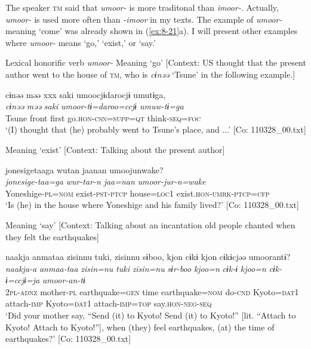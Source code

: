The speaker \textsc{tm} said that \textit{umoor-} is more traditonal than \textit{imoor-}. Actually, \textit{umoor-} is used more often than \textit{-imoor} in my texts. The example of \textit{umoor-} meaning ‘come’ was already shown in (\ref{ex:8-21}a). I will present other examples where \textit{umoor-} means ‘go,’ ‘exist,’ or ‘say.’

\ea\label{ex:8-22}
  Lexical honorific verb \textit{umoor-}
\ea Meaning ‘go’ [Context: US thought that the present author went to the house of \textsc{tm}, who is \textit{cɨnəə} ‘Tsune’ in the following example.]

   {\US}
\glll   cɨnəə  məə  xxx  saki  umoocjɨdarocjɨ  umutɨga,\\
\textit{cɨnəə}  \textit{məə}    \textit{saki}  \textit{umoor-tɨ=daroo=ccjɨ  umuw-tɨ=ga}\\
Tsune  front    first  go.\textsc{hon}-\textsc{csn}=\textsc{supp}=\textsc{qt}  think-\textsc{seq}=\textsc{foc}\\
\glt ‘(I) thought that (he) probably went to Tsune’s place, and ...’ [Co: 110328\_00.txt]

\ex Meaning ‘exist’ [Context: Talking about the present author]

   {\US}
\glll   jonesigetaaga  wutan  jaanan      umoojunwake?\\
\textit{jonesige-taa=ga}  \textit{wur-tar-n}  \textit{jaa=nan}       \textit{umoor-jur-n=wake} \\
Yoneshige-\textsc{pl}=\textsc{nom}  exist-\textsc{pst}-\textsc{ptcp}  house=\textsc{loc1}   exist.\textsc{hon}-\textsc{umrk}-\textsc{ptcp}=\textsc{cfp}\\
\glt ‘Is (he) in the house where Yoneshige and his family lived?’ [Co: 110328\_00.txt]

\ex Meaning ‘say’ [Context: Talking about an incantation old people chanted when they felt the earthquakes]

{\TM}
\glll  naakja{\footnotemark} anmataa  zisinnu  tuki,  zisinnu  sɨboo,{\footnotemark}  kjon  cɨkɨ  kjon  cɨkɨcjəə  umoorantɨ?\\
\textit{naakja-a}  \textit{anmaa-taa}  \textit{zisin=nu}  \textit{tuki}  \textit{zisin=nu}  \textit{sɨr-boo}      \textit{kjoo=n}  \textit{cɨk-ɨ}  \textit{kjoo=n}  \textit{cɨk-ɨ=ccjɨ=ja}  \textit{umoor-an-tɨ}\\
2\textsc{pl}-\textsc{adnz}  mother-\textsc{pl}  earthquake=\textsc{gen}  time  earthquake=\textsc{nom}  do-\textsc{cnd}    Kyoto=\textsc{dat1}  attach-\textsc{imp}  Kyoto=\textsc{dat1}  attach-\textsc{imp}=\textsc{top}  say.\textsc{hon}-\textsc{neg}-\textsc{seq}\\
\glt ‘Did your mother say, “Send (it) to Kyoto! Send (it) to Kyoto!” [lit. “Attach to Kyoto! Attach to Kyoto!”], when (they) feel earthquakes, (at) the time of earthquakes?’ [Co: 110328\_00.txt]
\z
\z

